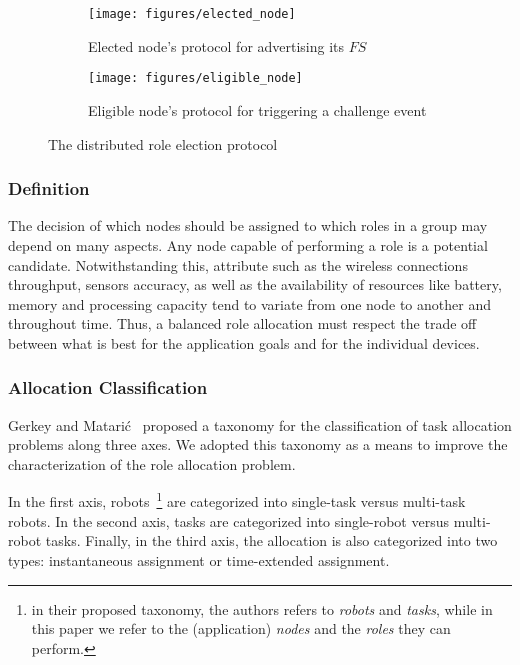 \begin{figure}[t!]
	\centering
	\begin{subfigure}[b]{0.45\textwidth}
		\centering
		\texttt{[image: figures/elected\_node]}
		\caption{Elected node's protocol for advertising its $FS$}
		\label{fig:elected_node}
	\end{subfigure}%
	
	\begin{subfigure}[b]{0.55\textwidth}
		\centering
		\texttt{[image: figures/eligible\_node]}
		\caption{Eligible node's protocol for triggering a challenge event}
		\label{fig:eligible_node}
	\end{subfigure}
	\caption{The distributed role election protocol}
	\label{fig:role_allocation}
\end{figure}
 
\subsubsection{\textbf{Definition}} The decision of which nodes should be assigned to which roles in a group may depend on many aspects. Any node capable of performing a role is a potential candidate. Notwithstanding this, attribute such as the wireless connections throughput, sensors accuracy, as well as the availability of resources like battery, memory and processing capacity tend to variate from one node to another and throughout time. Thus, a balanced role allocation must respect the trade off between what is best for the application goals and for the individual devices. 

\subsubsection{\textbf{Allocation Classification}} Gerkey and Matarić~\cite{Gerkey:2004} proposed a taxonomy for the classification of task allocation problems along three axes. We adopted this taxonomy as a means to improve the characterization of the role allocation problem.

In the first axis, robots~\footnote{in their proposed taxonomy, the authors refers to \textit{robots} and \textit{tasks}, while in this paper we refer to the (application) \textit{nodes} and the \textit{roles} they can perform.} 
are categorized into single-task versus multi-task robots. In the second axis, tasks are categorized into single-robot versus multi-robot tasks. Finally, in the third axis, the allocation is also categorized into two types: instantaneous assignment or time-extended assignment.

